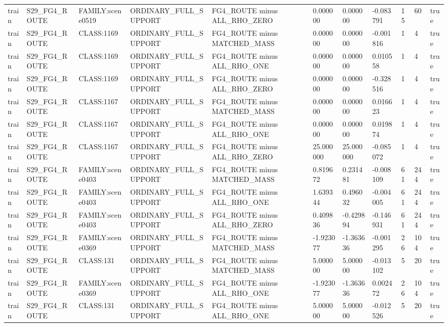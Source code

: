 \begin{tabular}{lllllllllll}
train & S29\_FG4\_ROUTE & FAMILY:scene0519 & ORDINARY\_FULL\_SUPPORT & FG4\_ROUTE minus ALL\_RHO\_ZERO & 0.000000 & 0.000000 & -0.083791 & 15 & 60 & true \\
train & S29\_FG4\_ROUTE & CLASS:1169 & ORDINARY\_FULL\_SUPPORT & FG4\_ROUTE minus MATCHED\_MASS & 0.000000 & 0.000000 & -0.001816 & 1 & 4 & true \\
train & S29\_FG4\_ROUTE & CLASS:1169 & ORDINARY\_FULL\_SUPPORT & FG4\_ROUTE minus ALL\_RHO\_ONE & 0.000000 & 0.000000 & 0.010558 & 1 & 4 & true \\
train & S29\_FG4\_ROUTE & CLASS:1169 & ORDINARY\_FULL\_SUPPORT & FG4\_ROUTE minus ALL\_RHO\_ZERO & 0.000000 & 0.000000 & -0.328516 & 1 & 4 & true \\
train & S29\_FG4\_ROUTE & CLASS:1167 & ORDINARY\_FULL\_SUPPORT & FG4\_ROUTE minus MATCHED\_MASS & 0.000000 & 0.000000 & 0.016623 & 1 & 4 & true \\
train & S29\_FG4\_ROUTE & CLASS:1167 & ORDINARY\_FULL\_SUPPORT & FG4\_ROUTE minus ALL\_RHO\_ONE & 0.000000 & 0.000000 & 0.019874 & 1 & 4 & true \\
train & S29\_FG4\_ROUTE & CLASS:1167 & ORDINARY\_FULL\_SUPPORT & FG4\_ROUTE minus ALL\_RHO\_ZERO & 25.000000 & 25.000000 & -0.085072 & 1 & 4 & true \\
train & S29\_FG4\_ROUTE & FAMILY:scene0403 & ORDINARY\_FULL\_SUPPORT & FG4\_ROUTE minus MATCHED\_MASS & 0.819672 & 0.231481 & -0.008109 & 61 & 244 & true \\
train & S29\_FG4\_ROUTE & FAMILY:scene0403 & ORDINARY\_FULL\_SUPPORT & FG4\_ROUTE minus ALL\_RHO\_ONE & 1.639344 & 0.496032 & -0.004005 & 61 & 244 & true \\
train & S29\_FG4\_ROUTE & FAMILY:scene0403 & ORDINARY\_FULL\_SUPPORT & FG4\_ROUTE minus ALL\_RHO\_ZERO & 0.409836 & -0.429894 & -0.146931 & 61 & 244 & true \\
train & S29\_FG4\_ROUTE & FAMILY:scene0369 & ORDINARY\_FULL\_SUPPORT & FG4\_ROUTE minus MATCHED\_MASS & -1.923077 & -1.363636 & -0.001295 & 26 & 104 & true \\
train & S29\_FG4\_ROUTE & CLASS:131 & ORDINARY\_FULL\_SUPPORT & FG4\_ROUTE minus MATCHED\_MASS & 5.000000 & 5.000000 & -0.013102 & 5 & 20 & true \\
train & S29\_FG4\_ROUTE & FAMILY:scene0369 & ORDINARY\_FULL\_SUPPORT & FG4\_ROUTE minus ALL\_RHO\_ONE & -1.923077 & -1.363636 & 0.002472 & 26 & 104 & true \\
train & S29\_FG4\_ROUTE & CLASS:131 & ORDINARY\_FULL\_SUPPORT & FG4\_ROUTE minus ALL\_RHO\_ONE & 5.000000 & 5.000000 & -0.012526 & 5 & 20 & true \\

\end{tabular}
